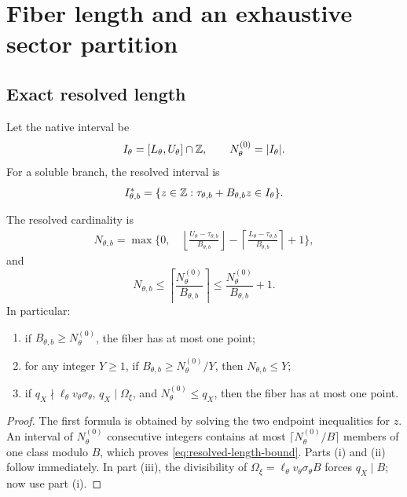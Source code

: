 \section{Fiber length and an exhaustive sector partition}
\label{sec:fiber-sector-partition}

\subsection{Exact resolved length}

Let the native interval be
\[
 I_\theta=[L_\theta,U_\theta]\cap\mathbb Z,
 \qquad N_\theta^{(0)}=|I_\theta|.
\]
For a soluble branch, the resolved interval is
\[
 I_{\theta,b}^\ast
 =
 \{z\in\mathbb Z:\tau_{\theta,b}+B_{\theta,b}z\in I_\theta\}.
\]

\begin{proposition}
\label{prop:progression-thinning}
The resolved cardinality is
\begin{align}
 N_{\theta,b}
 =
 \max\biggl\{0,\,
 &\left\lfloor
 \frac{U_\theta-\tau_{\theta,b}}{B_{\theta,b}}
 \right\rfloor
 -
 \left\lceil
 \frac{L_\theta-\tau_{\theta,b}}{B_{\theta,b}}
 \right\rceil
 +1\biggr\},
\label{eq:exact-resolved-length}
\end{align}
and
\begin{equation}
 N_{\theta,b}
 \le
 \left\lceil
 \frac{N_\theta^{(0)}}{B_{\theta,b}}
 \right\rceil
 \le
 \frac{N_\theta^{(0)}}{B_{\theta,b}}+1.
\label{eq:resolved-length-bound}
\end{equation}
In particular:
\begin{enumerate}[label=(\roman*),leftmargin=2.2em]
\item if \(B_{\theta,b}\ge N_\theta^{(0)}\), the fiber has at most
  one point;
\item for any integer \(Y\ge1\), if
  \(B_{\theta,b}\ge N_\theta^{(0)}/Y\), then
  \(N_{\theta,b}\le Y\);
\item if \(q_X\nmid\ell_\theta v_\theta\sigma_\theta\),
  \(q_X\mid\Omega_\xi\), and
  \(N_\theta^{(0)}\le q_X\), then the fiber has at most one point.
\end{enumerate}
\end{proposition}

\begin{proof}
The first formula is obtained by solving the two endpoint
inequalities for \(z\).  An interval of \(N_\theta^{(0)}\)
consecutive integers contains at most
\(\lceil N_\theta^{(0)}/B\rceil\) members of one class modulo \(B\),
which proves \eqref{eq:resolved-length-bound}.  Parts (i) and (ii)
follow immediately.  In part (iii), the divisibility of
\(\Omega_\xi=\ell_\theta v_\theta\sigma_\theta B\) forces
\(q_X\mid B\); now use part (i).
\end{proof}


